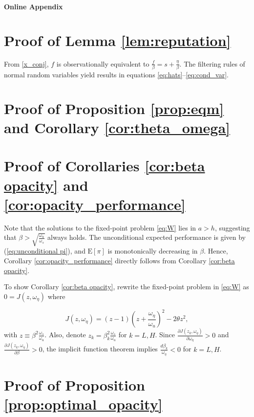 \begin{center}
{\LARGE\textbf{Online Appendix}}
\end{center}
\appendix
\label{app:appendix}
\onehalfspacing


\section{Proof of Lemma \ref{lem:reputation}} \label{proofLbeliefs}
From \eqref{x_conj}, $f$ is observationally equivalent to $\frac{f}{\beta} = s + \frac{\eta}{\beta}$. The filtering rules of normal random variables yield results in equations \eqref{eq:hats}--\eqref{eq:cond_var}.

\section{Proof of Proposition \ref{prop:eqm} and Corollary \ref{cor:theta_omega}} \label{proofendogenous}


\section{Proof of Corollaries \ref{cor:beta opacity} and \ref{cor:opacity_performance}}
Note that the solutions to the fixed-point problem \eqref{eq:W} lies in $a>h$, suggesting that $\beta>\sqrt{\frac{\omega_u}{\omega_s}}$ always holds. The unconditional expected performance is given by (\ref{eq:unconditional pi}), and $\mathrm{E}[\pi]$ is monotonically decreasing in $\beta$. Hence, Corollary \ref{cor:opacity_performance} directly follows from Corollary \ref{cor:beta opacity}.

To show Corollary \ref{cor:beta opacity}, rewrite the fixed-point problem in \eqref{eq:W} as $0=J(z, \omega_{\eta})$ where

\begin{equation}
 J(z, \omega_{\eta}) = (z-1)\left(z + \frac{\omega_{\eta}}{\omega_u}\right)^2 -2\theta z^2,\label{eq:fpp_z}
\end{equation}
with $z\equiv \beta^2 \frac{\omega_{s}}{\omega_u}$. Also, denote $z_k = \beta_k^2 \frac{\omega_{s}}{\omega_u}$ for $k=L,H$.
Since $\frac{\partial J(z_k, \omega_{\eta})}{\partial \omega_{\eta}} >0$ and $\frac{\partial J(z_k, \omega_{\eta})}{\partial \beta} >0$, the implicit function theorem implies $\frac{d\beta_k}{\omega_{\eta}}<0$ for $k=L,H$.

%

\section{Proof of Proposition \ref{prop:optimal_opacity}}
